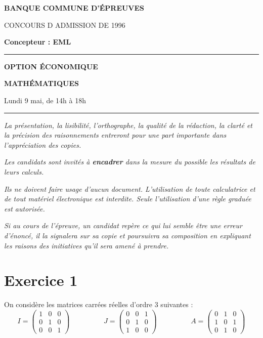 \documentclass[11pt]{article}%
\begin{document}

\begin{center}
{\LARG\E\textbf{BANQUE COMMUNE D'ÉPREUVES}}



{\large \textsc{CONCOURS D ADMISSION DE 1996}}



{\large \textbf{Concepteur : EML}}



\rule{2.39cm}{0.05cm}



{\Large \textbf{OPTION ÉCONOMIQUE}}



{\Large \textbf{MATHÉMATIQUES }}



{\Large Lundi 9 mai, de 14h à 18h}



\rule{2.39cm}{0.05cm}
\end{center}

\textit{La présentation, la lisibilité, l'orthographe, la qualité
de la rédaction, la clarté et la précision des raisonnements
entreront pour une part importante dans l'appréciation des copies.}

\textit{Les candidats sont invités à \textbf{encadrer} dans la mesure
du possible les résultats de leurs calculs.}

\textit{Ils ne doivent faire usage d'aucun document. L'utilisation de
toute
calculatrice et de tout matériel électronique est interdite. Seule
l'utilisation d'une règle graduée est autorisée.}

\textit{Si au cours de l'épreuve, un candidat repère ce qui lui semble
être une erreur d'énoncé, il la signalera sur sa copie et
poursuivra sa composition en expliquant les raisons des initiatives
qu'il sera
amené à prendre.}

\vspace*{3cm}

\section*{Exercice 1}

\noindent On considère les matrices carrées réelles
d'ordre 3 suivantes : 
\[
I = \left( 
\begin{array}{ccc}
1 & 0 & 0 \\
0 & 1 & 0 \\
0 & 0 & 1
\end{array}
\right) \hspace{2cm}J = \left( 
\begin{array}{ccc}
0 & 0 & 1 \\
0 & 1 & 0 \\
1 & 0 & 0
\end{array}
\right) \hspace{2cm}A = \left( 
\begin{array}{ccc}
0 & 1 & 0 \\
1 & 0 & 1 \\
0 & 1 & 0
\end{array}
\right) 
\]
\end{document}
